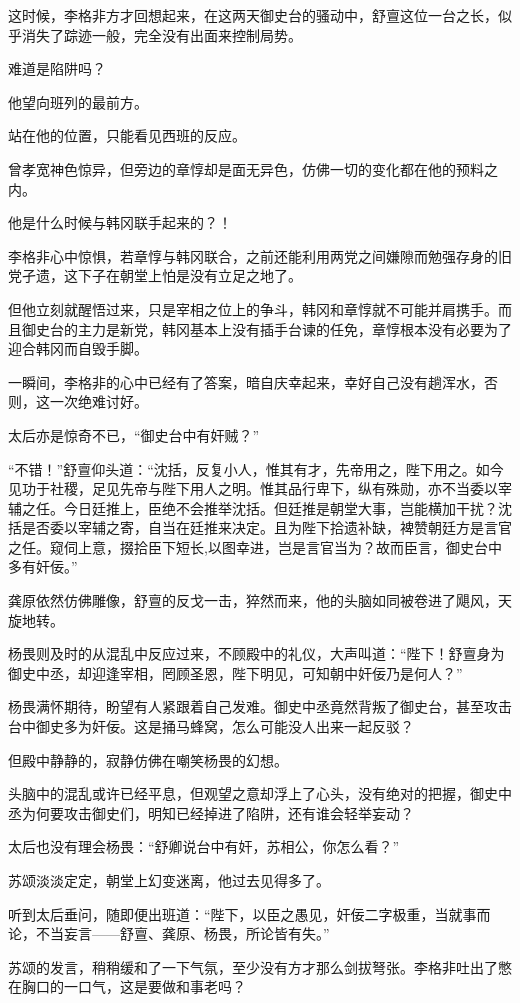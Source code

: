 这时候，李格非方才回想起来，在这两天御史台的骚动中，舒亶这位一台之长，似乎消失了踪迹一般，完全没有出面来控制局势。

难道是陷阱吗？

他望向班列的最前方。

站在他的位置，只能看见西班的反应。

曾孝宽神色惊异，但旁边的章惇却是面无异色，仿佛一切的变化都在他的预料之内。

他是什么时候与韩冈联手起来的？！

李格非心中惊惧，若章惇与韩冈联合，之前还能利用两党之间嫌隙而勉强存身的旧党孑遗，这下子在朝堂上怕是没有立足之地了。

但他立刻就醒悟过来，只是宰相之位上的争斗，韩冈和章惇就不可能并肩携手。而且御史台的主力是新党，韩冈基本上没有插手台谏的任免，章惇根本没有必要为了迎合韩冈而自毁手脚。

一瞬间，李格非的心中已经有了答案，暗自庆幸起来，幸好自己没有趟浑水，否则，这一次绝难讨好。

太后亦是惊奇不已，“御史台中有奸贼？”

“不错！”舒亶仰头道：“沈括，反复小人，惟其有才，先帝用之，陛下用之。如今见功于社稷，足见先帝与陛下用人之明。惟其品行卑下，纵有殊勋，亦不当委以宰辅之任。今日廷推上，臣绝不会推举沈括。但廷推是朝堂大事，岂能横加干扰？沈括是否委以宰辅之寄，自当在廷推来决定。且为陛下拾遗补缺，裨赞朝廷方是言官之任。窥伺上意，掇拾臣下短长,以图幸进，岂是言官当为？故而臣言，御史台中多有奸佞。”

龚原依然仿佛雕像，舒亶的反戈一击，猝然而来，他的头脑如同被卷进了飓风，天旋地转。

杨畏则及时的从混乱中反应过来，不顾殿中的礼仪，大声叫道：“陛下！舒亶身为御史中丞，却迎逢宰相，罔顾圣恩，陛下明见，可知朝中奸佞乃是何人？”

杨畏满怀期待，盼望有人紧跟着自己发难。御史中丞竟然背叛了御史台，甚至攻击台中御史多为奸佞。这是捅马蜂窝，怎么可能没人出来一起反驳？

但殿中静静的，寂静仿佛在嘲笑杨畏的幻想。

头脑中的混乱或许已经平息，但观望之意却浮上了心头，没有绝对的把握，御史中丞为何要攻击御史们，明知已经掉进了陷阱，还有谁会轻举妄动？

太后也没有理会杨畏：“舒卿说台中有奸，苏相公，你怎么看？”

苏颂淡淡定定，朝堂上幻变迷离，他过去见得多了。

听到太后垂问，随即便出班道：“陛下，以臣之愚见，奸佞二字极重，当就事而论，不当妄言——舒亶、龚原、杨畏，所论皆有失。”

苏颂的发言，稍稍缓和了一下气氛，至少没有方才那么剑拔弩张。李格非吐出了憋在胸口的一口气，这是要做和事老吗？

